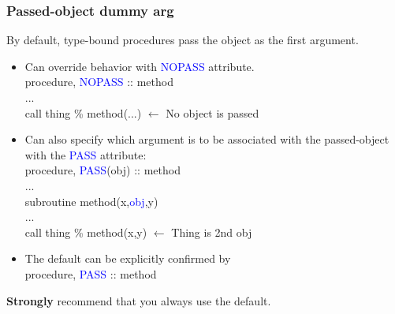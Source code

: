 \documentclass[11pt]{beamer}
\begin{document}
\begin{frame}[fragile]
\frametitle{Passed-object dummy arg}

\scriptsize{
By default, type-bound procedures pass the object as the first argument.
\begin{itemize}
  \item Can override behavior with \textcolor{blue}{NOPASS} attribute.\\
  \quad procedure, \textcolor{blue}{NOPASS} :: method\\
  \quad ...\\
  \quad call thing \% method(...)  $\leftarrow$ No object is passed \\
  
  \item Can also specify which argument is to be associated with the passed-object with the \textcolor{blue}{PASS} attribute:\\
  \quad procedure, \textcolor{blue}{PASS}(obj) :: method\\
  \quad ...\\
  \quad subroutine method(x,\textcolor{blue}{obj},y) \\
  \quad ... \\
  \quad call thing \% method(x,y)  $\leftarrow$ Thing is 2nd obj \\
  \item The default can be explicitly confirmed by \\
  \quad procedure, \textcolor{blue}{PASS} :: method\\
\end{itemize}
\textbf{Strongly} recommend that you always use the default.
}

\end{frame}

\end{document}
